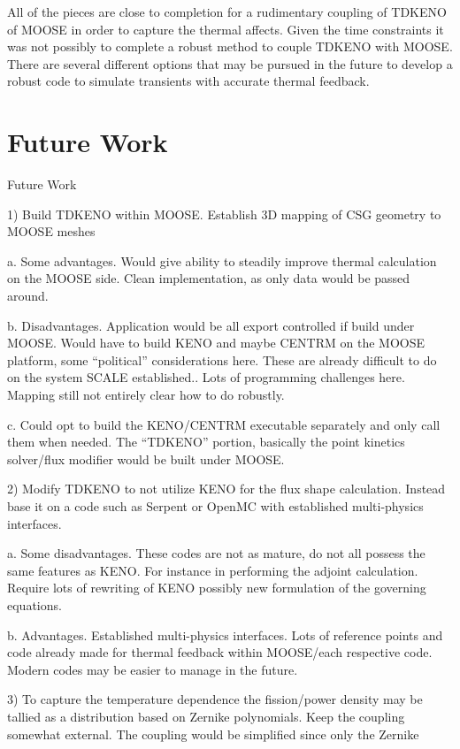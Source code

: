 \documentclass[11pt]{article}
\begin{document}
All of the pieces are close to completion for a rudimentary coupling of TDKENO of MOOSE in order to capture the thermal affects.  Given the time constraints it was not possibly to complete a robust method to couple TDKENO with MOOSE.  There are several different options that may be pursued in the future to develop a robust code to simulate transients with accurate thermal feedback. 

\section{Future Work}

Future Work 
 
1)	Build TDKENO within MOOSE.  Establish 3D mapping of CSG geometry to MOOSE meshes

a.	Some advantages.  Would give ability to steadily improve thermal calculation on the MOOSE side. Clean implementation, as only data would be passed around.  

b.	Disadvantages.  Application would be all export controlled if build under MOOSE.  Would have to build KENO and maybe CENTRM on the MOOSE platform, some “political” considerations here.  These are already difficult to do on the system SCALE established..  Lots of programming challenges here. Mapping still not entirely clear how to do robustly.

c.	Could opt to build the KENO/CENTRM executable separately and only call them when needed.  The “TDKENO” portion, basically the point kinetics solver/flux modifier would be built under MOOSE.

2)	Modify TDKENO to not utilize KENO for the flux shape calculation.  Instead base it on a code such as Serpent or OpenMC with established multi-physics interfaces. 

a.	Some disadvantages.  These codes are not as mature, do not all possess the same features as KENO.  For instance in performing the adjoint calculation.   Require lots of rewriting of KENO possibly new formulation of the governing equations.

b.	Advantages.  Established multi-physics interfaces.  Lots of reference points and code already made for thermal feedback within MOOSE/each respective code. Modern codes may be easier to manage in the future. 

3)	To capture the temperature dependence the fission/power density may be tallied as a distribution based on Zernike polynomials.  Keep the coupling somewhat external.  The coupling would be simplified since only the Zernike
\end{document}
